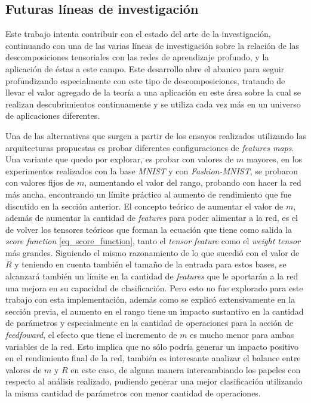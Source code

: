 \documentclass[spanish]{article}
\theoremstyle{definition}
\theoremstyle{remark}
\numberwithin{equation}{section}
\numberwithin{equation}{section} %
\begin{document}
\par
\subsection{Futuras líneas de investigación}
\label{ssec:future}
Este trabajo intenta contribuir con el estado del arte de la investigación, continuando con una de las varias líneas de investigación sobre la relación de las descomposiciones tensoriales con las redes de aprendizaje profundo, y la aplicación de éstas a este campo. Este desarrollo abre el abanico para seguir profundizando especialmente con este tipo de descomposiciones, tratando de llevar el valor agregado de la teoría a una aplicación en este área sobre la cual se realizan descubrimientos continuamente y se utiliza cada vez más en un universo de aplicaciones diferentes.
\par
Una de las alternativas que surgen a partir de los ensayos realizados utilizando las arquitecturas propuestas es probar diferentes configuraciones de \textit{features maps}. Una variante que quedo por explorar, es probar con valores de $m$ mayores, en los experimentos realizados con la base \textit{MNIST} y con \textit{Fashion-MNIST}, se probaron con valores fijos de $m$, aumentando el valor del rango, probando con hacer la red más ancha, encontrando un límite práctico al aumento de rendimiento que fue discutido en la sección anterior. El concepto teórico de aumentar el valor de  $m$, además de aumentar la cantidad de \textit{features} para poder alimentar a la red, es el de volver los tensores teóricos que forman la ecuación que tiene como salida la \textit{score function} \eqref{eq_score_function}, tanto el \textit{tensor feature} como el \textit{weight tensor} más grandes. Siguiendo el mismo razonamiento de lo que sucedió con el valor de $R$ y teniendo en cuenta también el tamaño de la entrada para estos bases, se alcanzará también un límite en la cantidad de \textit{features} que le aportarán a la red una mejora en su capacidad de clasificación. Pero esto no fue explorado para este trabajo con esta implementación, además como se explicó extensivamente en la sección previa, el aumento en el rango tiene un impacto sustantivo en la cantidad de parámetros y especialmente en la cantidad de operaciones para la acción de \textit{feedfoward}, el efecto que tiene el incremento de $m$ es mucho menor para ambas variables de la red. Esto implica que no sólo podría generar un impacto positivo en el rendimiento final de la red, también es interesante analizar el balance entre valores de $m$ y $R$ en este caso, de alguna manera intercambiando los papeles con respecto al análisis realizado, pudiendo generar una mejor clasificación utilizando la misma cantidad de parámetros con menor cantidad de operaciones.      
\end{document}
